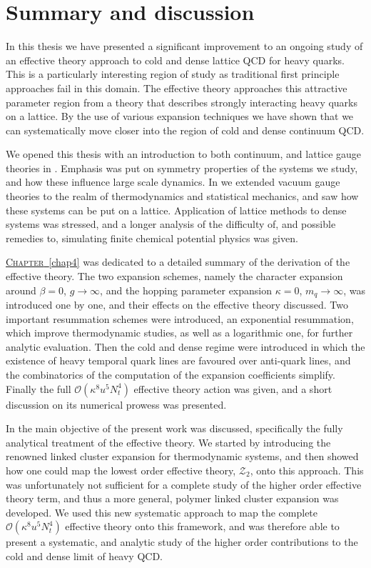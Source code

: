 \chapter{Summary and discussion}

In this thesis we have presented a significant improvement to an ongoing study
of an effective theory approach to cold and dense lattice QCD for heavy quarks.
This is a particularly interesting region of study as traditional first
principle approaches fail in this domain. The effective theory approaches this
attractive parameter region from a theory that describes strongly interacting
heavy quarks on a lattice. By the use of various expansion techniques we have
shown that we can systematically move closer into the region of cold and dense
continuum QCD.

We opened this thesis with an introduction to both continuum, and lattice gauge
theories in . Emphasis was put on symmetry properties of the
systems we study, and how these influence large scale dynamics. In
 we extended vacuum gauge theories to the realm of thermodynamics
and statistical mechanics, and saw how these systems can be put on a lattice.
Application of lattice methods to dense systems was stressed, and a longer
analysis of the difficulty of, and possible remedies to, simulating finite chemical
potential physics was given.

\hyperref[chap4]{\mbox{\textsc{Chapter} \ref*{chap4}}} was dedicated to a
detailed summary of the derivation of the effective theory. The two expansion
schemes, namely the character expansion around $\beta = 0$, $g \to \infty$, and
the hopping parameter expansion $\kappa = 0$, $m_q \to \infty$, was introduced
one by one, and their effects on the effective theory discussed. Two important
resummation schemes were introduced, an exponential resummation, which improve
thermodynamic studies, as well as a logarithmic one, for further analytic
evaluation. Then the cold and dense regime were introduced in which the
existence of heavy temporal quark lines are favoured over anti-quark lines, and
the combinatorics of the computation of the expansion coefficients simplify.
Finally the full $\mathcal{O}(\kappa^8 u^5 N_t^4)$ effective theory action was
given, and a short discussion on its numerical prowess was presented.

In  the main objective of the present work was discussed,
specifically the fully analytical treatment of the effective theory. We started
by introducing the renowned linked cluster expansion for thermodynamic systems,
and then showed how one could map the lowest order effective theory,
$\mathcal{Z}_2$, onto this approach. This was unfortunately not sufficient for a
complete study of the higher order effective theory term, and thus a more
general, polymer linked cluster expansion was developed. We used this new
systematic approach to map the complete $\mathcal{O}(\kappa^8 u^5 N_t^4)$
effective theory onto this framework, and was therefore able to present a
systematic, and analytic study of the higher order contributions to the cold and
dense limit of heavy QCD.

